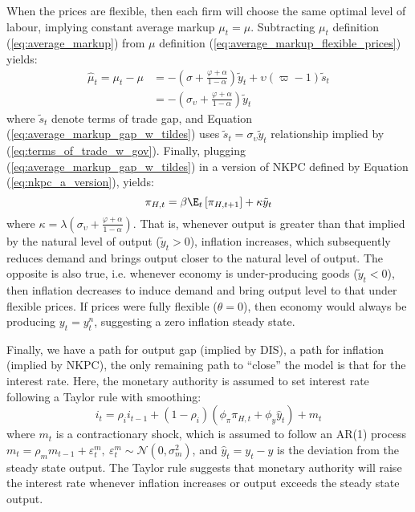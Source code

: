 When the prices are flexible, then each firm will choose the same optimal level of labour, implying constant average markup $\mu_t = \mu$. Subtracting $\mu_t$ definition (\ref{eq:average_markup}) from $\mu$ definition (\ref{eq:average_markup_flexible_prices}) yields:
\begin{align}
    \hat{\mu}_t = \mu_t - \mu &= - \left( \sigma + \frac{\varphi + \alpha}{1-\alpha}\right) \tilde{y}_t + \upsilon(\varpi-1)\tilde{s}_t \\
     &= - \left( \sigma_\upsilon + \frac{\varphi + \alpha}{1-\alpha}\right) \tilde{y}_t \label{eq:average_markup_gap_w_tildes}
\end{align}
where $\tilde{s}_t$ denote terms of trade gap, and Equation (\ref{eq:average_markup_gap_w_tildes}) uses $\tilde{s}_t=\sigma_\upsilon \tilde{y}_t$ relationship implied by (\ref{eq:terms_of_trade_w_gov}). Finally, plugging (\ref{eq:average_markup_gap_w_tildes}) in a version of NKPC defined by Equation (\ref{eq:nkpc_a_version}), yields:
\begin{equation}
    \pi_{H,t} = \beta \E_t \left[ \pi_{H,t+1}\right] + \kappa \tilde{y}_t
\end{equation}
where $\kappa=\lambda\left( \sigma_\upsilon + \frac{\varphi + \alpha}{1-\alpha}\right)$. That is, whenever output is greater than that implied by the natural level of output ($\tilde{y}_t > 0$), inflation increases, which subsequently reduces demand and brings output closer to the natural level of output. The opposite is also true, i.e. whenever economy is under-producing goods ($\tilde{y}_t < 0$), then inflation decreases to induce demand and bring output level to that under flexible prices. If prices were fully flexible ($\theta = 0$), then economy would always be producing $y_t = y^n_t$, suggesting a zero inflation steady state.

Finally, we have a path for output gap (implied by DIS), a path for inflation (implied by NKPC), the only remaining path to ``close'' the model is that for the interest rate. Here, the monetary authority is assumed to set interest rate following a Taylor rule with smoothing:
\begin{equation}
    i_t = \rho_i i_{t-1} + (1-\rho_i)(\phi_\pi \pi_{H,t}+ \phi_y \hat{y}_t) + m_t
\end{equation}
where $m_t$ is a contractionary shock, which is assumed to follow an AR(1) process $m_t = \rho_m m_{t-1} + \varepsilon^m_{t},\ \varepsilon^m_{t} \sim \mathcal{N}(0,\sigma^2_m)$, and $\hat{y}_t = y_t - y$ is the deviation from the steady state output. The Taylor rule suggests that monetary authority will raise the interest rate whenever inflation increases or output exceeds the steady state output.